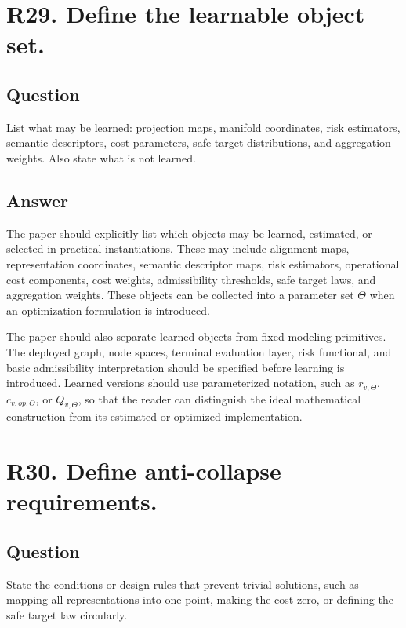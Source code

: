 \documentclass[11pt,a4paper]{article}
\begin{document}
\section*{R29. Define the learnable object set.}

\subsection*{Question}

List what may be learned: projection maps, manifold coordinates, risk estimators, semantic descriptors, cost parameters, safe target distributions, and aggregation weights. Also state what is not learned.

\subsection*{Answer}

The paper should explicitly list which objects may be learned, estimated, or selected in practical instantiations. These may include alignment maps, representation coordinates, semantic descriptor maps, risk estimators, operational cost components, cost weights, admissibility thresholds, safe target laws, and aggregation weights. These objects can be collected into a parameter set \(\Theta\) when an optimization formulation is introduced.

The paper should also separate learned objects from fixed modeling primitives. The deployed graph, node spaces, terminal evaluation layer, risk functional, and basic admissibility interpretation should be specified before learning is introduced. Learned versions should use parameterized notation, such as \(r_{v,\Theta}\), \(c_{v,op,\Theta}\), or \(Q_{v,\Theta}\), so that the reader can distinguish the ideal mathematical construction from its estimated or optimized implementation.

\section*{R30. Define anti-collapse requirements.}

\subsection*{Question}

State the conditions or design rules that prevent trivial solutions, such as mapping all representations into one point, making the cost zero, or defining the safe target law circularly.
\end{document}
